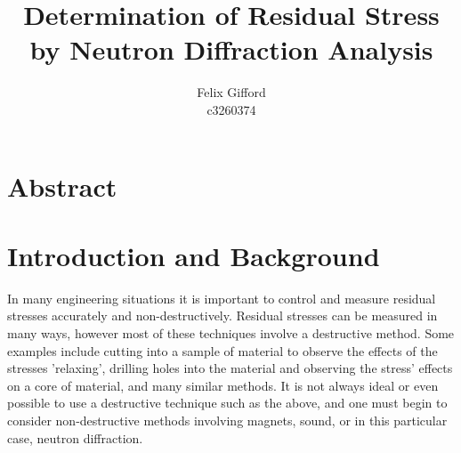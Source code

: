 \documentclass[11pt, oneside]{article}   	%
\title{Determination of Residual Stress by Neutron Diffraction Analysis}
\author{Felix Gifford\\c3260374}
\begin{document}
\maketitle
\section{Abstract}
\section{Introduction and Background}
In many engineering situations it is important to control and measure residual stresses accurately and non-destructively. Residual stresses can be measured in many ways, however most of these techniques involve a destructive method. Some examples include cutting into a sample of material to observe the effects of the stresses 'relaxing', drilling holes into the material and observing the stress' effects on a core of material, and many similar methods. It is not always ideal or even possible to use a destructive technique such as the above, and one must begin to consider non-destructive methods involving magnets, sound, or in this particular case, neutron diffraction.
\end{document}
